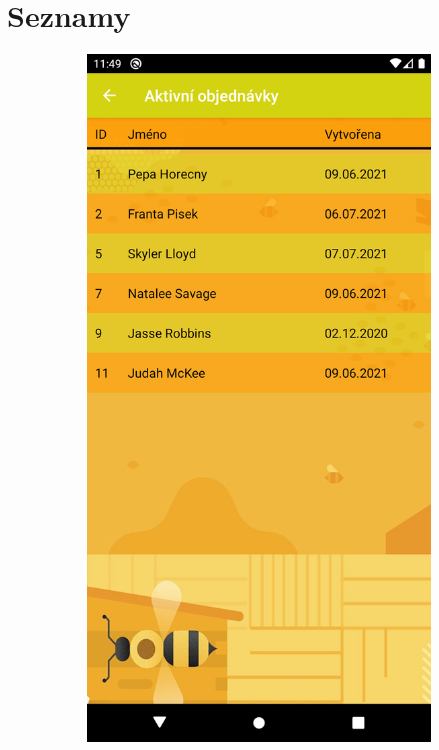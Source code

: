 \documentclass[12pt]{report}
\begin{document}
\section{Seznamy}
\begin{figure}[H]
	\centering
	\begin{subfigure}{.45\textwidth}
	  \centering
	  \includegraphics[width=\textwidth]{img/order_list.png}

\end{subfigure}
\end{figure}
\end{document}
